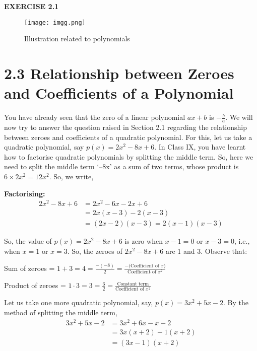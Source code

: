 \documentclass[12pt]{article}
\begin{document}
\begin{center}
\textbf{\Large EXERCISE 2.1}
\end{center}

\vspace{1em}

\begin{figure}[h!]
\centering
\texttt{[image: imgg.png]}
\caption{Illustration related to polynomials}
\label{fig:poly_intro}
\end{figure}

\section*{2.3 Relationship between Zeroes and Coefficients of a Polynomial}

You have already seen that the zero of a linear polynomial \( ax + b \) is \( -\frac{b}{a} \). We will now try to answer the question raised in Section 2.1 regarding the relationship between zeroes
and coefficients of a quadratic polynomial. For this, let us take a quadratic polynomial, say
\( p(x) = 2x^2 - 8x + 6 \). In Class IX, you have learnt how to factorise quadratic polynomials by splitting the middle term. So, here we need to split the middle term ‘–8x’ as a sum of two terms, whose product is \(6 \times 2x^2 = 12x^2\). So, we write,

\textbf{Factorising:}
\[
\begin{aligned}
2x^2 - 8x + 6 &= 2x^2 - 6x - 2x + 6 \\
&= 2x(x - 3) - 2(x - 3) \\
&= (2x - 2)(x - 3) = 2(x - 1)(x - 3)
\end{aligned}
\]

So, the value of \( p(x) = 2x^2 - 8x + 6 \) is zero when \( x - 1 = 0 \) or \( x - 3 = 0 \), i.e., when
\( x = 1 \) or \( x = 3 \). So, the zeroes of \( 2x^2 - 8x + 6 \) are 1 and 3. Observe that:

\bigskip
\hspace*{6em} Sum of zeroes = \(1 + 3 = 4 = \frac{-(-8)}{2} = \frac{-\text{(Coefficient of } x)}{\text{Coefficient of } x^2}\)

\bigskip
\hspace*{6em} Product of zeroes = \(1 \cdot 3 = 3 = \frac{6}{2} = \frac{\text{Constant term}}{\text{Coefficient of } x^2}\)

\bigskip

Let us take one more quadratic polynomial, say, \( p(x) = 3x^2 + 5x - 2 \). By the method of splitting the middle term,
\[
\begin{aligned}
3x^2 + 5x - 2 &= 3x^2 + 6x - x - 2 \\
&= 3x(x + 2) - 1(x + 2) \\
&= (3x - 1)(x + 2)
\end{aligned}
\]
\end{document}
